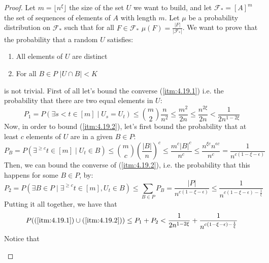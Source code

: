         \begin{proof}
            Let $m = \lfloor n^\xi \rfloor$ the size of the set $U$ we want to build, and let $\mathcal{F}_* = [A]^m$
                the set of sequences of elements of $A$ with length $m$.
            Let $\mu$ be a probability distribution on $\mathcal{F}_*$ such that for all $F \in \mathcal{F}_*$
                $\mu(F) = \frac{|F|}{|\mathcal{F}_*|}$.
            We want to prove that the probability that a random $U$ satisfies:
            \begin{enumerate}
                \item\label{itm:4.19.1} All elements of $U$ are distinct
                \item\label{itm:4.19.2} For all $B \in P$ $|U \cap B| < K$
            \end{enumerate}
                is not trivial.
            First of all let's bound the converse (\ref{itm:4.19.1}) i.e. the probability that there are two equal elements
                in $U$:
            \[
                P_1 = P(\exists s < t \in [m] \mid U_s = U_t)
                    \leq {m \choose 2} \frac{n}{n^2}
                    \leq \frac{m^2}{2n}
                    \leq \frac{n^{2\xi}}{2n}
                    < \frac{1}{2n^{1-2\xi}}
            \]
            Now, in order to bound (\ref{itm:4.19.2}), let's first bound the probability that at least $c$ elements of
                $U$ are in a given $B \in P$:
            \[
                P_B = P(\exists^{\geq c} t\in [m] \mid U_t \in B)
                    \leq {m \choose c} \left( \frac{|B|}{n} \right)^c
                    \leq \frac{m^c |B|^c}{n^c}
                    \leq \frac{n^{\xi c} n^{\epsilon c}}{n^c}
                    = \frac{1}{n^{c (1 - \xi - \epsilon)}}
            \]
            Then, we can bound the converse of (\ref{itm:4.19.2}), i.e. the probability that this happens for some $B \in P$,
                by:
            \[
                P_2 = P(\exists B \in P \mid \exists^{\geq c} t\in [m], U_t \in B)
                    \leq \sum_{B \in P} P_B
                    = \frac{|P|}{n^{c (1 - \xi - \epsilon)}}
                    \leq \frac{1}{n^{c (1 - \xi - \epsilon) - \frac{1}{\xi}}}
            \]
            Putting it all together, we have that
            \[
                P((\ref{itm:4.19.1}) \cup (\ref{itm:4.19.2}))
                    \leq P_1 + P_2
                    < \frac{1}{2n^{1-2\xi}} + \frac{1}{n^{c (1 - \xi - \epsilon) - \frac{1}{\xi}}}
            \]
            Notice that
            \begin{itemize}

\end{itemize}
\end{proof}
